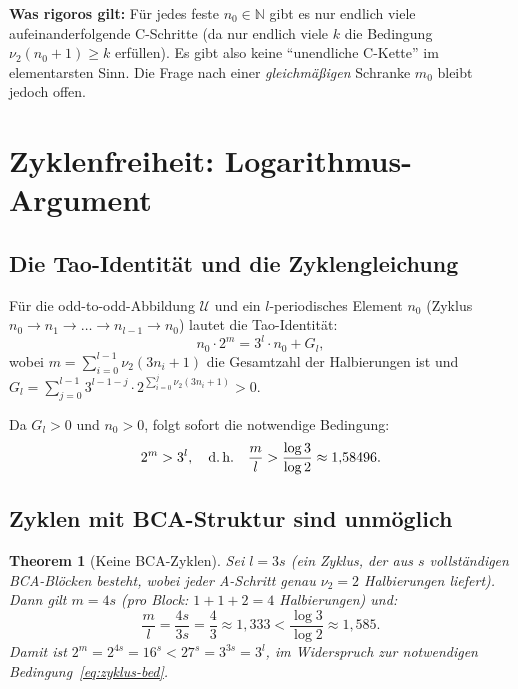 \documentclass[12pt,a4paper]{article}
\newtheorem{theorem}[definition]{Theorem}
\newcommand{\vii}{\nu_2}
\newcommand{\U}{\mathcal{U}}
\newcommand{\N}{\mathbb{N}}
\begin{document}
\begin{tcolorbox}[ergebnis]
\textbf{Was rigoros gilt:}
Für jedes feste $n_0 \in \N$ gibt es nur endlich viele aufeinanderfolgende
C-Schritte (da nur endlich viele $k$ die Bedingung $\vii(n_0+1) \geq k$
erfüllen). Es gibt also keine ``unendliche C-Kette'' im elementarsten Sinn.
Die Frage nach einer \emph{gleichmäßigen} Schranke $m_0$ bleibt jedoch offen.
\end{tcolorbox}

\section{Zyklenfreiheit: Logarithmus-Argument}
\label{sec:zyklen}

\subsection{Die Tao-Identität und die Zyklengleichung}

Für die odd-to-odd-Abbildung $\U$ und ein $l$-periodisches Element
$n_0$ (Zyklus $n_0 \to n_1 \to \ldots \to n_{l-1} \to n_0$) lautet
die Tao-Identität:
\[
  n_0 \cdot 2^m = 3^l \cdot n_0 + G_l,
\]
wobei $m = \sum_{i=0}^{l-1} \vii(3n_i+1)$ die Gesamtzahl der Halbierungen ist
und $G_l = \sum_{j=0}^{l-1} 3^{l-1-j} \cdot 2^{\sum_{i=0}^j \vii(3n_i+1)} > 0$.

Da $G_l > 0$ und $n_0 > 0$, folgt sofort die notwendige Bedingung:
\begin{equation}
  \label{eq:zyklus-bed}
  2^m > 3^l,
  \quad\text{d.\,h.}\quad
  \frac{m}{l} > \frac{\log 3}{\log 2} \approx 1{,}58496.
\end{equation}

\subsection{Zyklen mit B\textbullet C\textbullet A-Struktur sind unmöglich}

\begin{theorem}[Keine B\textbullet C\textbullet A-Zyklen]
\label{thm:kein-bca-zyklus}
Sei $l = 3s$ (ein Zyklus, der aus $s$ vollständigen B\textbullet C\textbullet A-Blöcken
besteht, wobei jeder A-Schritt genau $\vii = 2$ Halbierungen liefert).
Dann gilt $m = 4s$ (pro Block: $1 + 1 + 2 = 4$ Halbierungen) und:
\[
  \frac{m}{l} = \frac{4s}{3s} = \frac{4}{3} \approx 1{,}333 < \frac{\log 3}{\log 2} \approx 1{,}585.
\]
Damit ist $2^m = 2^{4s} = 16^s < 27^s = 3^{3s} = 3^l$,
im Widerspruch zur notwendigen Bedingung~\eqref{eq:zyklus-bed}.
\end{theorem}
\end{document}
